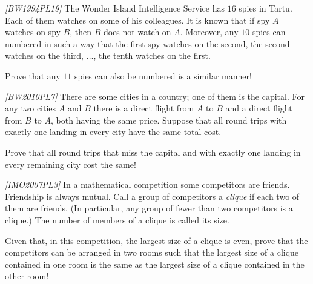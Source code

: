 

%

\renewcommand{\theenumi}{\alph{enumi}}



\noindent
 
\filbreak

\begin{problem}
\textit{[BW1994PL19]}
The Wonder Island Intelligence Service has $16$ spies in Tartu. Each of them watches on some of his colleagues. It is known that if spy $A$ watches on spy $B$, then $B$ does not watch on $A$. Moreover, any $10$ spies can numbered in such a way that the first spy watches on the second, the second watches on the third, $ \dots $, the tenth watches on the first. 

Prove that any $11$ spies can also be numbered is a similar manner!
\end{problem}
%

\begin{problem}
\textit{[BW2010PL7]}
There are some cities in a country; one of them is the capital. For any two cities $A$ and $B$ there is a direct flight from $A$ to $B$ and a direct flight from $B$ to $A$, both having the
same price. Suppose that all round trips with exactly one landing in every city have the same total cost. 

Prove that all round trips that miss the capital and with exactly one landing in every remaining city cost the same!
\end{problem}
%

\begin{problem}
\textit{[IMO2007PL3]}
In a mathematical competition some competitors are friends. Friendship is always mutual. Call a group of competitors a \textit{clique} if each two of them are friends. (In particular, any group of fewer than two competitors is a clique.) The number of members of a clique is called its size. 

Given that, in this competition, the largest size of a clique is even, prove that the competitors can be arranged in two rooms such that the largest size of a clique contained in one room is the same as the largest size of a clique contained in the other room!
\end{problem}
%

